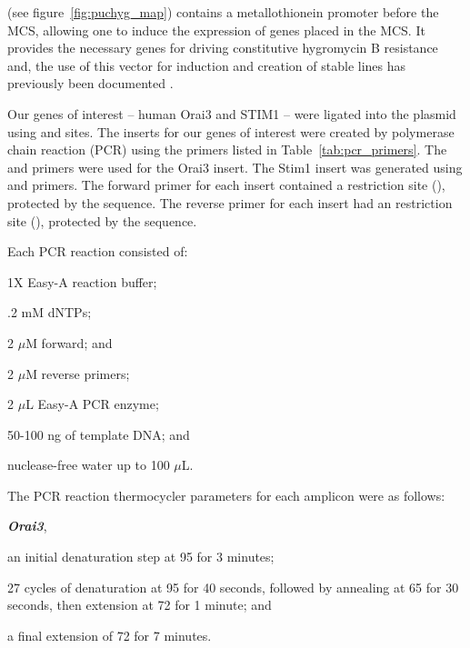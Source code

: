 \puchygmt{}  (see figure~\ref{fig:puchyg_map}) contains a metallothionein promoter %
 before the MCS, allowing one to induce the expression of genes placed in the MCS. It  provides the necessary genes for driving constitutive hygromycin B resistance %
 and, the use of this vector for induction and creation of stable lines has previously been documented \citep{Eble1998}. 

Our genes of interest -- human %
Orai3 and STIM1 -- were ligated into the \puchygmt{} plasmid using \sali{} and \xbai{} sites. The inserts for our genes of interest were created by polymerase chain reaction (PCR) using the primers listed in Table~\ref{tab:pcr_primers}. 
The \oraithreeclonefwd and \oraithreeclonerev primers were used for the Orai3 insert. 
The Stim1 insert was generated using \stimclonefwd and \stimclonerev  primers. 
The forward primer for each insert contained a \sali{} restriction site (\salisite), protected by the \nruisite{} sequence. The reverse primer for each insert had an \xbai{} restriction site (\xbaisite), protected by the \nruisite{} sequence. 

Each PCR reaction consisted of: 
\begin{inparaenum}[(i)] 
\item 1X Easy-A reaction buffer;
\item .2 mM dNTPs;
\item 2 $\mu$M forward; and
\item 2 $\mu$M reverse primers; 
\item 2 $\mu$L Easy-A PCR enzyme; 
\item 50-100 ng of template DNA; and
\item nuclease-free water up to 100 $\mu$L. 
\end{inparaenum}

The PCR reaction thermocycler parameters for each amplicon were as follows: 

\textbf{\itshape %
Orai3}, 
\begin{inparaenum}[(i)]
\item an initial denaturation step at 95 \textcelsius{} for 3 minutes;
\item 27 cycles of denaturation at 95 \textcelsius{} for 40 seconds, followed by annealing at 65 \textcelsius{} for 30 seconds, then extension at 72 \textcelsius{} for 1 minute; and
\item a final extension of 72 \textcelsius{} for 7 minutes. 
\end{inparaenum}

